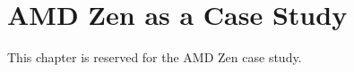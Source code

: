 \chapter{AMD Zen as a Case Study}
\label{chap:amd-zen}

This chapter is reserved for the AMD Zen case study.

